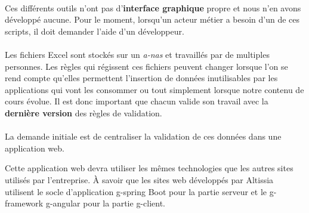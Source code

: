 \paragraph{}
Ces différents outils n'ont pas d'\textbf{interface graphique} propre et nous n'en avons développé aucune.
Pour le moment, lorsqu'un acteur métier a besoin d'un de ces scripts, il doit demander l'aide d'un développeur.

\paragraph{}
Les fichiers Excel sont stockés sur un \textit{\gls{a-nas}} et travaillés par de multiples personnes.
Les règles qui régissent ces fichiers peuvent changer lorsque l'on se rend compte qu'elles permettent l'insertion de données inutilisables par les applications qui vont les consommer ou tout simplement lorsque notre contenu de cours évolue.
Il est donc important que chacun valide son travail avec la \textbf{dernière version} des règles de validation.

\paragraph{}
La demande initiale est de centraliser la validation de ces données dans une application web.

Cette application web devra utiliser les mêmes technologies que les autres sites utilisés par l'entreprise. À savoir que les sites web développés par Altissia utilisent le socle d'application \Gls{g-spring} Boot pour la partie serveur et le \gls{g-framework} \Gls{g-angular} pour la partie \gls{g-client}.
